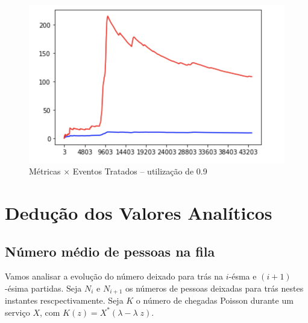 \documentclass[a4paper]{article}
\begin{document}
\begin{figure}[h!]
    \centering
    \includegraphics[width=.6\textwidth]{imagens/utilizacao9.png}
    \caption{Métricas \(\times\) Eventos Tratados --
        utilização de 0.9}
\end{figure}

\newpage
\section{Dedução dos Valores Analíticos}
\subsection{Número médio de pessoas na fila}
Vamos analisar a evolução do número
deixado para trás na \(i\)-ésma e \((i+1)\)-ésima partidas.
Seja \(N_i\) e  \(N_{i+1}\) os números de pessoas
deixadas para trás nestes instantes rescpectivamente.
Seja \(K\) o número de chegadas Poisson
durante um serviço \(X\),
com \(K(z) = X^*(\lambda - \lambda \; z)\).
\end{document}
